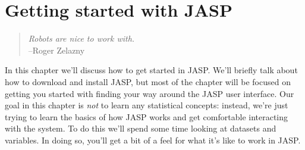 

\chapter{Getting started with JASP\label{ch:introj}}

\begin{quote}
{\it Robots are nice to work with.}\\ 
\hspace*{2cm}--Roger Zelazny
\end{quote}


\noindent
In this chapter we'll discuss how to get started in JASP. We'll briefly talk about how to download and install JASP, but most of the chapter will be focused on getting you started with finding your way around the JASP user interface. Our goal in this chapter is \emph{not} to learn any statistical concepts: instead, we're just trying to learn the basics of how JASP works and get comfortable interacting with the system. To do this we'll spend some time looking at datasets and variables. In doing so, you'll get a bit of a feel for what it's like to work in JASP. 

